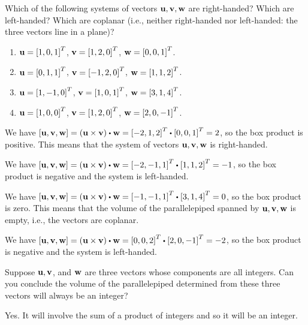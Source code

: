 \begin{ex}
  Which of the following systems of vectors
  $\vect{u},\vect{v},\vect{w}$ are right-handed? Which are
  left-handed? Which are coplanar (i.e., neither right-handed nor
  left-handed: the three vectors line in a plane)?
  \begin{enumerate}
  \item $\vect{u}=\mat{1,0,1}^T$, $\vect{v}=\mat{1,2,0}^T$, $\vect{w}=\mat{0,0,1}^T$.
  \item $\vect{u}=\mat{0,1,1}^T$, $\vect{v}=\mat{-1,2,0}^T$, $\vect{w}=\mat{1,1,2}^T$.
  \item $\vect{u}=\mat{1,-1,0}^T$, $\vect{v}=\mat{1,0,1}^T$, $\vect{w}=\mat{3,1,4}^T$.
  \item $\vect{u}=\mat{1,0,0}^T$, $\vect{v}=\mat{1,2,0}^T$, $\vect{w}=\mat{2,0,-1}^T$.
  \end{enumerate}
  \begin{sol}
  \item We have
    $\boxprod{\vect{u},\vect{v},\vect{w}} = (\vect{u}\times\vect{v})
    \dotprod \vect{w} = \mat{-2,1,2}^T\dotprod\mat{0,0,1}^T=2$, so
    the box product is positive. This means that the system of vectors
    $\vect{u},\vect{v},\vect{w}$ is right-handed.
  \item We have
    $\boxprod{\vect{u},\vect{v},\vect{w}} = (\vect{u}\times\vect{v})
    \dotprod \vect{w} = \mat{-2,-1,1}^T\dotprod\mat{1,1,2}^T=-1$, so
    the box product is negative and the system is left-handed.
  \item We have
    $\boxprod{\vect{u},\vect{v},\vect{w}} = (\vect{u}\times\vect{v})
    \dotprod \vect{w} = \mat{-1,-1,1}^T\dotprod\mat{3,1,4}^T=0$, so
    the box product is zero. This means that the volume of the
    parallelepiped spanned by $\vect{u},\vect{v},\vect{w}$ is empty,
    i.e., the vectors are coplanar.
  \item We have
    $\boxprod{\vect{u},\vect{v},\vect{w}} = (\vect{u}\times\vect{v})
    \dotprod \vect{w} = \mat{0,0,2}^T\dotprod\mat{2,0,-1}^T=-2$, so
    the box product is negative and the system is left-handed.
  \end{sol}
\end{ex}

\begin{ex}
  Suppose $\vect{u},\vect{v}$, and $\vect{w}$ are three vectors whose
  components are all integers. Can you conclude the volume of the
  parallelepiped determined from these three vectors will always be an
  integer?
  \begin{sol}
    Yes. It will involve the sum of a product of integers and so it will
    be an integer.
  \end{sol}
\end{ex}

